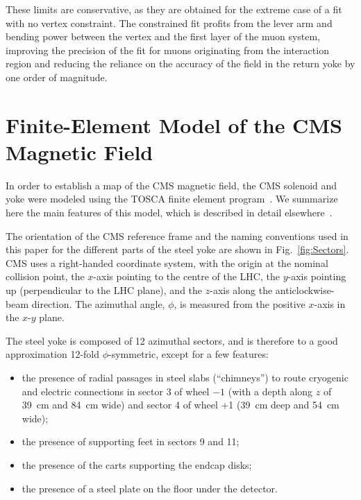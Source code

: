 These limits are conservative, as they are
obtained for the extreme case of a fit with no vertex constraint. The
constrained fit profits from the lever arm and bending power between
the vertex and
the first  layer of the muon system, improving the precision of the fit
for muons originating from the interaction region and reducing the
reliance on the accuracy of the field in the return yoke by one order
of magnitude.

\section{Finite-Element Model of the CMS Magnetic Field}
\label{sec:TOSCA}
In order to establish a map of the CMS magnetic field,
the CMS solenoid and yoke were modeled using the
TOSCA finite element program~\cite{TOSCA}. We summarize here the main
features of this model, which is  described in detail elsewhere~\cite{CERN:042}.

The orientation of the CMS reference frame and the naming
conventions used in this paper for the different parts of the steel
yoke are shown in Fig.~\ref{fig:Sectors}.
CMS uses a right-handed coordinate system, with the origin at the nominal
collision point, the $x$-axis pointing to the centre of the LHC, the $y$-axis
pointing up (perpendicular to the LHC plane), and the $z$-axis along the
anticlockwise-beam direction.
The azimuthal angle, $\phi$, is measured from the positive $x$-axis
in the $x$-$y$ plane.

The steel yoke is composed of 12 azimuthal sectors, and is therefore to
a good approximation 12-fold $\phi$-symmetric,
except for a few features:
\begin{itemize}
\item the presence of radial passages in steel slabs (``chimneys'')
  to route cryogenic and electric
  connections in sector 3 of wheel $-1$ (with a depth along $z$ of
  39~cm and 84~cm wide)
  and sector 4 of wheel +1 (39~cm deep and 54~cm wide);
\item the presence of supporting feet in sectors 9 and 11;
\item the presence of the carts supporting the endcap disks;
\item the presence of a steel plate on the floor under the detector.
\end{itemize}

